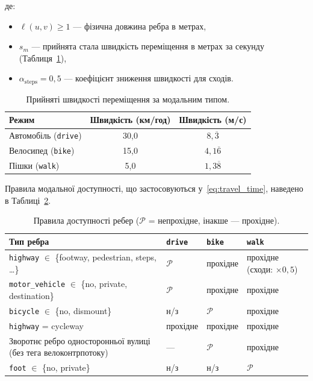 \documentclass[12pt, a4paper]{article}
\theoremstyle{definition}
\begin{document}
\noindent де:
\begin{itemize}
  \item $\ell(u,v) \geq 1$ --- фізична довжина ребра в метрах,
  \item $s_m$ --- прийнята стала швидкість переміщення в метрах за секунду
        (Таблиця~\ref{tab:speeds}),
  \item $\alpha_{\text{steps}} = 0{,}5$ --- коефіцієнт зниження швидкості
        для сходів.
\end{itemize}

\begin{table}[h]
  \centering
  \caption{Прийняті швидкості переміщення за модальним типом.}
  \label{tab:speeds}
  \begin{tabular}{lcc}
    \toprule
    Режим & Швидкість (км/год) & Швидкість (м/с) \\
    \midrule
    Автомобіль (\texttt{drive}) & 30{,}0 & $8{,}\overline{3}$ \\
    Велосипед (\texttt{bike})   & 15{,}0 & $4{,}1\overline{6}$ \\
    Пішки (\texttt{walk})       & 5{,}0  & $1{,}3\overline{8}$ \\
    \bottomrule
  \end{tabular}
\end{table}

Правила модальної доступності, що застосовуються у~\eqref{eq:travel_time},
наведено в Таблиці~\ref{tab:modal_rules}.

\begin{table}[h]
  \centering
  \caption{Правила доступності ребер ($\mathcal{P}$ = непрохідне, інакше --- прохідне).}
  \label{tab:modal_rules}
  \small
  \begin{tabular}{lp{4.8cm}p{4.8cm}p{3.5cm}}
    \toprule
    Тип ребра & \texttt{drive} & \texttt{bike} & \texttt{walk} \\
    \midrule
    \texttt{highway} $\in$ \{footway, pedestrian, steps, \ldots\}
      & $\mathcal{P}$ & прохідне & прохідне (сходи: $\times 0{,}5$) \\
    \texttt{motor\_vehicle} $\in$ \{no, private, destination\}
      & $\mathcal{P}$ & прохідне & прохідне \\
    \texttt{bicycle} $\in$ \{no, dismount\}
      & н/з & $\mathcal{P}$ & прохідне \\
    \texttt{highway} = cycleway
      & прохідне & прохідне & прохідне \\
    Зворотнє ребро односторонньої вулиці (без тега велоконтрпотоку)
      & --- & $\mathcal{P}$ & прохідне \\
    \texttt{foot} $\in$ \{no, private\}
      & н/з & н/з & $\mathcal{P}$ \\
    \bottomrule
  \end{tabular}
\end{table}
\end{document}
